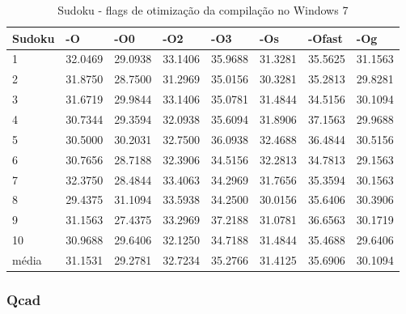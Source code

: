 \begin{table}[!ht]
\centering
\caption{Sudoku - flags de otimização da compilação no Windows 7}
\label{tab:otimizacao_compilacao:windows:sudoku}
\begin{tabular}{llllllll}
\textbf{Sudoku}    & \textbf{-O}  & \textbf{-O0}   & \textbf{-O2} & \textbf{-O3} & \textbf{-Os} & \textbf{-Ofast} & \textbf{-Og} \\ \toprule
1                  & 32.0469      & 29.0938        & 33.1406      & 35.9688      & 31.3281      & 35.5625         & 31.1563     \\ 
2                  & 31.8750      & 28.7500        & 31.2969      & 35.0156      & 30.3281      & 35.2813         & 29.8281     \\ 
3                  & 31.6719      & 29.9844        & 33.1406      & 35.0781      & 31.4844      & 34.5156         & 30.1094     \\ 
4                  & 30.7344      & 29.3594        & 32.0938      & 35.6094      & 31.8906      & 37.1563         & 29.9688     \\ 
5                  & 30.5000      & 30.2031        & 32.7500      & 36.0938      & 32.4688      & 36.4844         & 30.5156     \\ 
6                  & 30.7656      & 28.7188        & 32.3906      & 34.5156      & 32.2813      & 34.7813         & 29.1563     \\ 
7                  & 32.3750      & 28.4844        & 33.4063      & 34.2969      & 31.7656      & 35.3594         & 30.1563     \\ 
8                  & 29.4375      & 31.1094        & 33.5938      & 34.2500      & 30.0156      & 35.6406         & 30.3906     \\ 
9                  & 31.1563      & 27.4375        & 33.2969      & 37.2188      & 31.0781      & 36.6563         & 30.1719     \\ 
10                 & 30.9688      & 29.6406        & 32.1250      & 34.7188      & 31.4844      & 35.4688         & 29.6406     \\ \bottomrule
média              & 31.1531      & 29.2781        & 32.7234      & 35.2766      & 31.4125      & 35.6906         & 30.1094     \\ 
\end{tabular}
\end{table}

\clearpage
\subsubsection*{Qcad}

